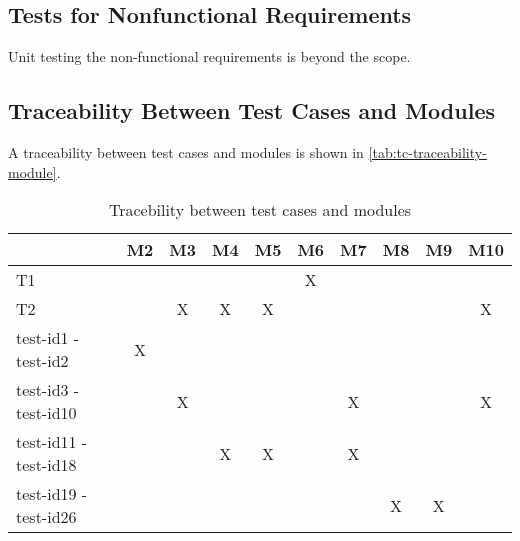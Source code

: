 \documentclass[12pt, titlepage]{article}
\begin{document}
\subsection{Tests for Nonfunctional Requirements}

Unit testing the non-functional requirements is beyond the scope.

\subsection{Traceability Between Test Cases and Modules}

A traceability between test cases and modules is shown in \autoref{tab:tc-traceability-module}.

\begin{table}[h!]
\begin{center}
\begin{tabular}{ |l|c|c|c|c|c|c|c|c|c| }
\hline
 & M2 & M3 & M4 & M5 & M6 & M7 & M8 & M9 & M10\\
\hline
T1 & & & & & X & & & &\\
\hline
T2 & & X & X & X & & & & & X\\
\hline
test-id1 - test-id2 & X & & & & & & & &\\
\hline
test-id3 - test-id10 & & X & & & & X & & & X\\
\hline
test-id11 - test-id18 & & & X & X & & X & & &\\
\hline
test-id19 - test-id26 & & & & & & & X & X &\\

\hline
\end{tabular}
\caption{Tracebility between test cases and modules}
\label{tab:tc-traceability-module}
\end{center}
\end{table}
				




\newpage



\end{document}
